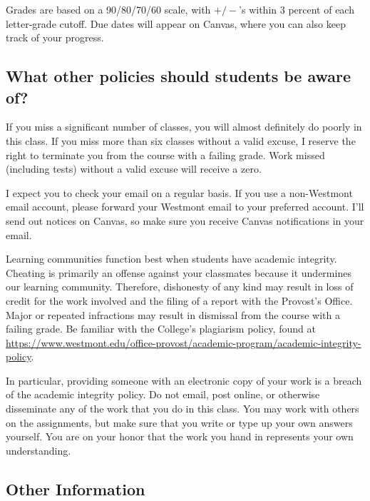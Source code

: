 \documentclass[
  twoside]{article}
\begin{document}
Grades are based on a 90/80/70/60 scale, with \(+/-\)'s within 3 percent
of each letter-grade cutoff. Due dates will appear on Canvas, where you
can also keep track of your progress.

\hypertarget{what-other-policies-should-students-be-aware-of}{%
\subsection{What other policies should students be aware
of?}\label{what-other-policies-should-students-be-aware-of}}

If you miss a significant number of classes, you will almost definitely
do poorly in this class. If you miss more than six classes without a
valid excuse, I reserve the right to terminate you from the course with
a failing grade. Work missed (including tests) without a valid excuse
will receive a zero.

I expect you to check your email on a regular basis. If you use a
non-Westmont email account, please forward your Westmont email to your
preferred account. I'll send out notices on Canvas, so make sure you
receive Canvas notifications in your email.

Learning communities function best when students have academic
integrity. Cheating is primarily an offense against your classmates
because it undermines our learning community. Therefore, dishonesty of
any kind may result in loss of credit for the work involved and the
filing of a report with the Provost's Office. Major or repeated
infractions may result in dismissal from the course with a failing
grade. Be familiar with the College's plagiarism policy, found at
\url{https://www.westmont.edu/office-provost/academic-program/academic-integrity-policy}.

In particular, providing someone with an electronic copy of your work is
a breach of the academic integrity policy. Do not email, post online, or
otherwise disseminate any of the work that you do in this class. You may
work with others on the assignments, but make sure that you write or
type up your own answers yourself. You are on your honor that the work
you hand in represents your own understanding.

\clearpage

\hypertarget{other-information}{%
\subsection{Other Information}\label{other-information}}
\end{document}
